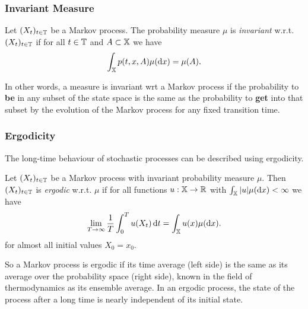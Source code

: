 \subsubsection*{Invariant Measure}

\begin{defi}
Let $(X_t)_{t\in\mathbb{T}}$ be a Markov process. The probability measure $\mu$ is \textit{invariant} w.r.t. $(X_t)_{t\in\mathbb{T}}$ if for all $t\in\mathbb{T}$ and $A \subset \mathbb{X}$ we have
\begin{equation*}
\int_{\mathbb{X}} p(t,x,A) \mu(\mathop{}\!\mathrm{d} x) = \mu(A).
\end{equation*}
\end{defi}
In other words, a measure is invariant wrt a Markov process if the probability to \textbf{be} in any subset of the state space is the same as the probability to \textbf{get} into that subset by the evolution of the Markov process for any fixed transition time.

\subsubsection*{Ergodicity}
The long-time behaviour of stochastic processes can be described using ergodicity.
\begin{defi}
Let $(X_t)_{t\in\mathbb{T}}$ be a Markov process with invariant probability measure $\mu$. Then $(X_t)_{t\in\mathbb{T}}$ is \textit{ergodic} w.r.t. $\mu$ if for all functions $u: \mathbb{X} \rightarrow \mathbb{R}$ with $\int_{\mathbb{X}} |u| \mu(\mathop{}\!\mathrm{d} x) < \infty$
we have
\begin{equation*}
\lim_{T \rightarrow \infty} \frac{1}{T} \int_0^T u(X_t) \mathop{}\!\mathrm{d} t = \int_{\mathbb{X}} u(x) \mu(\mathop{}\!\mathrm{d} x).
\end{equation*}
for almost all initial values $X_0=x_0$.
\end{defi}
So a Markov process is ergodic if its time average (left side) is the same as its average over the probability space (right side), known in the field of thermodynamics as its ensemble average. In an ergodic process, the state of the process after a long time is nearly independent of its initial state.

